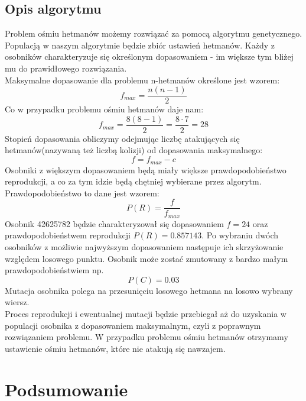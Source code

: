 \documentclass[12pt, twoside]{article}
\begin{document}
\subsection{Opis algorytmu}
Problem ośmiu hetmanów możemy rozwiązać za pomocą algorytmu genetycznego. Populacją w naszym algorytmie będzie zbiór ustawień hetmanów. Każdy z osobników charakteryzuje się określonym dopasowaniem - im większe tym bliżej mu do prawidłowego rozwiązania.\\
Maksymalne dopasowanie dla problemu n-hetmanów określone jest wzorem:
\[ f_{max} = \dfrac{n(n - 1)}{2} \]
Co w przypadku problemu ośmiu hetmanów daje nam:
\[ f_{max} = \dfrac{8(8 - 1)}{2} = \dfrac{8 \cdot 7}{2} = 28 \]
Stopień dopasowania obliczymy odejmując liczbę atakujących się hetmanów(nazywaną też liczbą kolizji) od dopasowania maksymalnego:
\[ f = f_{max} - c\]
Osobniki z większym dopasowaniem będą miały większe prawdopodobieństwo reprodukcji, a co za tym idzie będą chętniej wybierane przez algorytm. Prawdopodobieństwo to dane jest wzorem:
\[ P(R) = \dfrac{f}{f_{max}}\]
Osobnik 42625782 będzie charakteryzował się dopasowaniem \( f = 24\) oraz prawdopodobieństwem reprodukcji \( P(R) = 0.857143\).
Po wybraniu dwóch osobników z możliwie najwyższym dopasowaniem następuje ich skrzyżowanie względem losowego punktu. 
Osobnik może zostać zmutowany z bardzo małym prawdopodobieństwiem np.
\[ P(C) = 0.03 \]
Mutacja osobnika polega na przesunięciu losowego hetmana na losowo wybrany wiersz.
\\[12pt]
Proces reprodukcji i ewentualnej mutacji będzie przebiegał aż do uzyskania w populacji osobnika z dopasowaniem maksymalnym, czyli z poprawnym rozwiązaniem problemu. W przypadku problemu ośmiu hetmanów otrzymamy ustawienie ośmiu hetmanów, które nie atakują się nawzajem.

\clearpage
\section{Podsumowanie}
\end{document}
